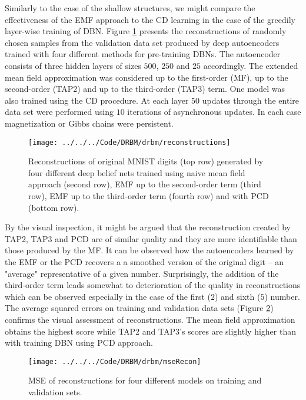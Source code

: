Similarly to the case of the shallow structures, we might compare the effectiveness of the EMF approach to the CD learning in the case of the greedily layer-wise training of DBN. Figure \ref{fig:drbm} presents the reconstructions of randomly chosen samples from the validation data set produced by deep autoencoders trained with four different methods for pre-training DBNs. The autoencoder consists of three hidden layers of sizes $500$, $250$ and $25$ accordingly. The extended mean field approximation was considered up to the first-order (MF), up to the second-order (TAP2) and up to the third-order (TAP3) term. One model was also trained using the CD procedure. At each layer $50$ updates through the entire data set were performed using $10$ iterations of asynchronous updates. In each case magnetization or Gibbs chains were persistent.

\begin{figure}[!htb]
\texttt{[image: ../../../Code/DRBM/drbm/reconstructions]}
  \caption[Reconstructions of digits with deep structures]{Reconstructions of original MNIST digits (top row) generated by four different deep belief nets trained using naive mean field approach (second row), EMF up to the second-order term (third row), EMF up to the third-order term (fourth row) and with PCD (bottom row).}
\label{fig:drbm}
\end{figure}
  
By the visual inspection, it might be argued that the reconstruction created by TAP2, TAP3 and PCD are of similar quality and they are more identifiable than those produced by the MF. 
It can be observed how the autoencoders learned by the EMF or the PCD recovers a a smoothed version of the original digit -- an "average" representative of a given number. Surprisingly, the addition of the third-order term leads somewhat to deterioration of the quality in reconstructions which can be observed especially in the case of the first ($2$) and sixth ($5$) number. 
The average squared errors on training and validation data sets (Figure \ref{fig:mse}) confirms the visual assessment of reconstructions. The mean field approximation obtains the highest score while TAP2 and TAP3's scores are slightly higher than with training DBN using PCD approach. 

\begin{figure}[!htb]
\begin{center}
\texttt{[image: ../../../Code/DRBM/drbm/mseRecon]}
\end{center}
  \caption[MSE of digits' reconstructions with different deep models]{MSE of reconstructions for four different models on training and validation sets.}
\label{fig:mse}
\end{figure}

